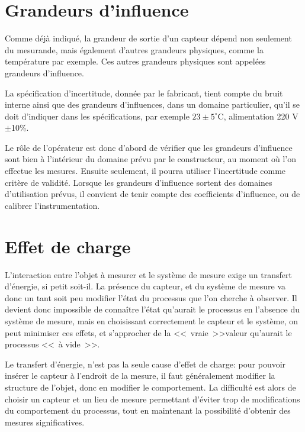 \documentclass[main.tex]{subfiles}
\begin{document}
\section{Grandeurs d'influence}

Comme déjà indiqué, la grandeur de sortie d'un capteur dépend non seulement du mesurande, mais également d'autres grandeurs physiques, comme la température par exemple. Ces autres grandeurs physiques sont appelées grandeurs d'influence.

La spécification d'incertitude, donnée par le fabricant, tient compte du bruit interne ainsi que des grandeurs d'influences, dans un domaine particulier, qu'il se doit d'indiquer dans les spécifications, par exemple $23\pm5^\circ$C, alimentation 220 V$\pm$10\%.

Le rôle de l'opérateur est donc d'abord de vérifier que les grandeurs d'influence sont bien à l'intérieur du domaine prévu par le constructeur, au moment où l'on effectue les mesures. Ensuite seulement, il pourra utiliser l'incertitude comme critère de validité. Lorsque les grandeurs d'influence sortent des domaines d'utilisation prévus, il convient de tenir compte des coefficients d'influence, ou de calibrer l'instrumentation.

\section{Effet de charge}

L'interaction entre l'objet à mesurer et le système de mesure exige un transfert d'énergie, si petit soit-il. La présence du capteur, et du système de mesure va donc un tant soit peu modifier l'état du processus que l'on cherche à observer. Il devient donc impossible de connaître l'état qu'aurait le processus en l'absence du système de mesure, mais en choisissant correctement le capteur et le système, on peut minimiser ces effets, et s'approcher de la \textless\textless\ vraie\ \textgreater\textgreater valeur qu'aurait le processus \textless\textless\ à vide\ \textgreater\textgreater.

Le transfert d'énergie, n'est pas la seule cause d'effet de charge: pour pouvoir insérer le capteur à l'endroit de la mesure, il faut généralement modifier la structure de l'objet, donc en modifier le comportement. La difficulté est alors de choisir un capteur et un lieu de mesure permettant d'éviter trop de modifications du comportement du processus, tout en maintenant la possibilité d'obtenir des mesures significatives.
\end{document}

